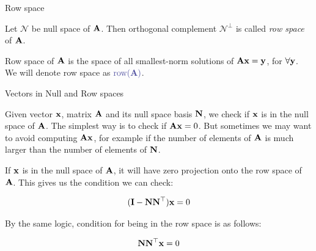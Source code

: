 \documentclass{beamer}
\begin{document}
\begin{frame}{Row space}
	\begin{flushleft}
		
		\begin{definition}
			Let $\mathcal{N}$ be null space of $\mathbf{A}$. Then orthogonal complement $\mathcal{N}^\perp$ is called \emph{row space} of $\mathbf{A}$.
		\end{definition}
	
		\bigskip
		
		Row space of $\mathbf{A}$ is the space of all smallest-norm solutions of $\mathbf{A}\mathbf{x} = \mathbf{y}$, for $\forall \mathbf{y}$. We will denote row space as $\textcolor{mydarkgray}{\text{row}(\bo{A})}$.
		
	\end{flushleft}
\end{frame}




\begin{frame}{Vectors in Null and Row spaces}
	\begin{flushleft}
		
		Given vector $\mathbf{x}$, matrix $\mathbf{A}$ and its null space basis $\mathbf{N}$, we check if $\mathbf{x}$ is in the null space of $\mathbf{A}$. The simplest way is to check if $\mathbf{A}\mathbf{x} = 0$. But sometimes we may want to avoid computing $\mathbf{A}\mathbf{x}$, for example if the number of elements of $\mathbf{A}$ is much larger than the number of elements of $\mathbf{N}$.
		
		\bigskip
		
		If $\mathbf{x}$ is in the null space of $\mathbf{A}$, it will have zero projection onto the row space of $\mathbf{A}$. This gives us the condition we can check:
		
		\begin{equation}
			(\mathbf{I} - \mathbf{N} \mathbf{N}^\top) \mathbf{x} = 0
		\end{equation}
		
		By the same logic, condition for being in the row space is as follows:
		
		\begin{equation}
			\mathbf{N} \mathbf{N}^\top \mathbf{x} = 0
		\end{equation}
		
		
	\end{flushleft}
\end{frame}
\end{document}

